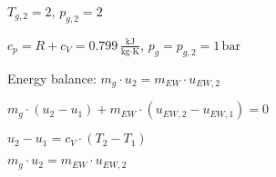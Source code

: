 \( T_{g,2} = 2 \), \( p_{g,2} = 2 \)  

\( c_{p} = R + c_{V} = 0.799 \, \frac{\text{kJ}}{\text{kg·K}} \), \( p_{g} = p_{g,2} = 1 \, \text{bar} \)  

Energy balance:  
\( m_{g} \cdot u_{2} = m_{EW} \cdot u_{EW,2} \)  

\( m_{g} \cdot (u_{2} - u_{1}) + m_{EW} \cdot (u_{EW,2} - u_{EW,1}) = 0 \)  

\( u_{2} - u_{1} = c_{V} \cdot (T_{2} - T_{1}) \)  

\( m_{g} \cdot u_{2} = m_{EW} \cdot u_{EW,2} \)